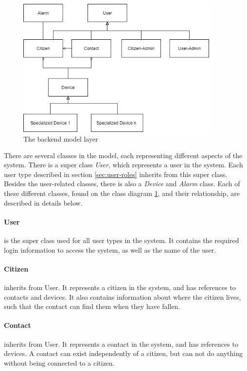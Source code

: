 \begin{figure}[H]
    \centering 
    \includegraphics[width=0.9\textwidth]{Figures/serverSidemodel.png}
    \caption{The backend model layer}
    \label{fig:serversidemodel}
\end{figure}

There are several classes in the model, each representing different aspects of the system. There is a super class \textit{User}, which represents a user in the system. Each user type described in section \ref{sec:user-roles} inherits from this super class. Besides the user-related classes, there is also a \textit{Device} and \textit{Alarm} class. Each of these different classes, found on the class diagram \ref{fig:serversidemodel}, and their relationship, are described in details below.

\paragraph{User} is the super class used for all user types in the system. It contains the required login information to access the system, as well as the name of the user.

\paragraph{Citizen} inherits from User. It represents a citizen in the system, and has references to contacts and devices. It also contains information about where the citizen lives, such that the contact can find them when they have fallen.

\paragraph{Contact} inherits from User. It represents a contact in the system, and has references to devices. A contact can exist independently of a citizen, but can not do anything without being connected to a citizen.

